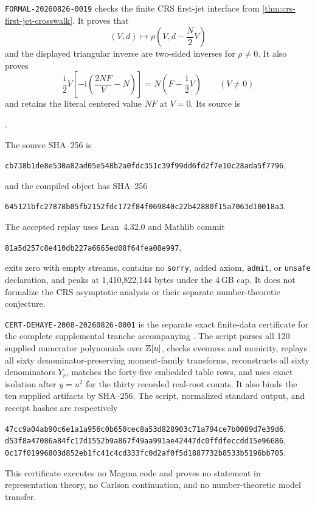 \texttt{FORMAL-20260826-0019} checks the finite CRS first-jet interface from
\cref{thm:crs-first-jet-crosswalk}.  It proves that
\[
 (V,d)\longmapsto
 \rho\left(V,d-\frac N2V\right)
\]
and the displayed triangular inverse are two-sided inverses for $\rho\ne0$.  It also
proves
\[
 \frac{\mathrm i}{2}V\left[-\mathrm i
 \left(\frac{2NF}{V}-N\right)\right]
 =N\left(F-\frac12V\right)
 \qquad(V\ne0)
\]
and retains the literal centered value $NF$ at $V=0$.  Its source is
\begin{center}\small
{}.
\end{center}
The source SHA--256 is
\begin{center}\small
\texttt{cb738b1de8e530a82ad05e548b2a0fdc351c39f99dd6fd2f7e10c28ada5f7796},
\end{center}
and the compiled object has SHA--256
\begin{center}\small
\texttt{645121bfc27878b05fb2152fdc172f84f069840c22b42880f15a7063d10018a3}.
\end{center}
The accepted replay uses Lean~4.32.0 and Mathlib commit
\begin{center}\small
\texttt{81a5d257c8e410db227a6665ed08f64fea08e997},
\end{center}
exits zero with empty streams, contains no \texttt{sorry}, added axiom,
\texttt{admit}, or \texttt{unsafe} declaration, and peaks at 1,410,822,144 bytes
under the 4\,GB cap.  It does not formalize the CRS asymptotic analysis or their
separate number-theoretic conjecture.

\texttt{CERT-DEHAYE-2008-20260826-0001} is the separate exact finite-data
certificate for the complete supplemental tranche accompanying
\cite{dehaye2008}.  The script
 parses all 120
supplied numerator polynomials over $\mathbb{Z}[u]$, checks evenness and monicity,
replays all sixty denominator-preserving moment-family transforms, reconstructs
all sixty denominators $Y_r$, matches the forty-five embedded table rows, and
uses exact isolation after $y=u^2$ for the thirty recorded real-root counts.  It
also binds the ten supplied artifacts by SHA--256.  The script, normalized
standard output, and receipt hashes are respectively
\begin{center}\small
\texttt{47cc9a04ab90c6e1a1a956c0b650cec8a53d828903c71a794ce7b0089d7e39d6},\\
\texttt{d53f8a47086a84fc17d1552b9a867f49aa991ae42447dc0ffdfeccdd15e96686},\\
\texttt{0c17f01996803d852eb1fc41c4cd333fc0d2af0f5d1887732b8533b5196bb705}.
\end{center}
This certificate executes no Magma code and proves no statement in representation
theory, no Carlson continuation, and no number-theoretic model transfer.

